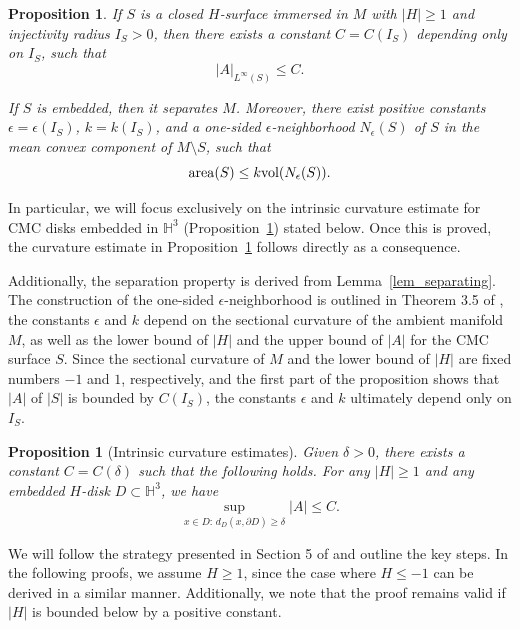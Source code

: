 \documentclass[12pt,a4paper]{amsart}
\numberwithin{equation}{section}
\theoremstyle{plain}
\newtheorem{Prop}[Th]{Proposition}
\theoremstyle{named}
\theoremstyle{definition}
\newcommand{\area}{{\rm{area}}}
\begin{document}
\begin{Prop}\label{prop_curv_est_sep}
If $S$ is a closed $H$-surface immersed in $M$ with $|H|\geq 1$ and injectivity radius $I_S>0$, then there exists a constant $C=C(I_S)$ depending only on $I_S$, such that \begin{equation*}
    |A|_{L^\infty(S)}\leq C.
\end{equation*}

If $S$ is embedded, then it separates $M$. Moreover, there exist positive constants $\epsilon=\epsilon(I_S)$, $k=k(I_S)$, and a one-sided $\epsilon$-neighborhood $N_\epsilon(S)$ of $S$ in the mean convex component of $M\setminus S$, such that \begin{equation*}
    \area(S)\leq k\text{vol}(N_\epsilon(S)).
\end{equation*}
\end{Prop}



In particular, we will focus exclusively on the intrinsic curvature estimate for CMC disks embedded in $\mathbb{H}^3$ (Proposition~\ref{prop_intrinsic}) stated below. Once this is proved, the curvature estimate in Proposition~\ref{prop_curv_est_sep} follows directly as a consequence. 

Additionally, the separation property is derived from Lemma~\ref{lem_separating}. The construction of the one-sided $\epsilon$-neighborhood is outlined in Theorem 3.5 of \cite{Meeks-Tinaglia_epsilon-nbhd}, the constants $\epsilon$ and $k$ depend on the sectional curvature of the ambient manifold $M$, as well as the lower bound of $|H|$ and the upper bound of $|A|$ for the CMC surface $S$. Since the sectional curvature of $M$ and the lower bound of $|H|$ are fixed numbers $-1$ and $1$, respectively, and the first part of the proposition shows that $|A|$ of $|S|$ is bounded by $C(I_S)$, the constants $\epsilon$ and $k$ ultimately depend only on $I_S$.



\begin{Prop}[Intrinsic curvature estimates]\label{prop_intrinsic}
    Given $\delta>0$, there exists a constant $C=C(\delta)$ such that the following holds. For any $|H|\geq 1$ and any embedded $H$-disk $D\subset \mathbb{H}^3$, we have \begin{equation*}
        \sup_{x\in D:\, d_D(x,\partial D)\geq \delta}|A|\leq C.
    \end{equation*}
\end{Prop}

We will follow the strategy presented in Section 5 of \cite{Tinaglia_review} and outline the key steps. In the following proofs, we assume $H\geq 1$, since the case where $H\leq -1$ can be derived in a similar manner. Additionally, we note that the proof remains valid if $|H|$ is bounded below by a positive constant.
\end{document}
